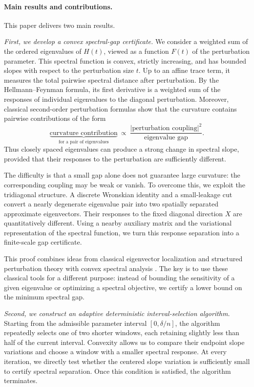 \documentclass[10pt,a4paper]{article}
\begin{document}
\paragraph{Main results and contributions.}
This paper delivers two main results.

\emph{First, we develop a convex spectral-gap certificate.}
We consider a weighted sum of the ordered eigenvalues
of $H(t)$, viewed as a function $F(t)$ of the perturbation
parameter. This spectral function is convex, strictly
increasing, and has bounded slopes with respect to the perturbation size $t$. Up to an affine
trace term, it measures the total pairwise spectral
distance after perturbation. By the Hellmann--Feynman formula, its first
derivative is a weighted sum of the responses of
individual eigenvalues to the diagonal perturbation.
Moreover, classical second-order perturbation formulas
show that the curvature contains pairwise contributions
of the form
\[
\underbrace{\text{curvature contribution}}_{
\text{for a pair of eigenvalues}}
\ \propto\
\frac{|\text{perturbation coupling}|^2}
{\text{eigenvalue gap}}.
\]
Thus closely spaced eigenvalues can produce a strong
change in spectral slope, provided that their responses
to the perturbation are sufficiently different.

The difficulty is that a small gap alone does not
guarantee large curvature: the corresponding coupling
may be weak or vanish. To overcome this, we exploit
the tridiagonal structure. A discrete Wronskian
identity and a small-leakage cut convert a nearly
degenerate eigenvalue pair into two spatially
separated approximate eigenvectors. Their responses
to the fixed diagonal direction $X$ are quantitatively
different. Using a nearby auxiliary matrix and the
variational representation of the spectral function,
we turn this response separation into a finite-scale
gap certificate.

This proof combines ideas from classical eigenvector
localization and structured perturbation theory
\cite{Ye1995,Parlett1996,Nakatsukasa2012}
with convex spectral analysis
\cite{OvertonWomersley1993,Lewis1996Convex,
LewisSendov2001}. The key is to use these classical
tools for a different purpose: instead of bounding
the sensitivity of a given eigenvalue or optimizing
a spectral objective, we certify a lower bound on
the minimum spectral gap.

\emph{Second, we construct an adaptive deterministic
interval-selection algorithm.}
Starting from the admissible parameter interval
$[0,\delta/n]$, the algorithm repeatedly selects
one of two shorter windows, each retaining slightly
less than half of the current interval. Convexity
allows us to compare their endpoint slope variations
and choose a window with a smaller spectral response.
At every iteration, we directly test whether the
centered slope variation is sufficiently small to
certify spectral separation. Once this condition
is satisfied, the algorithm terminates. 
\end{document}
